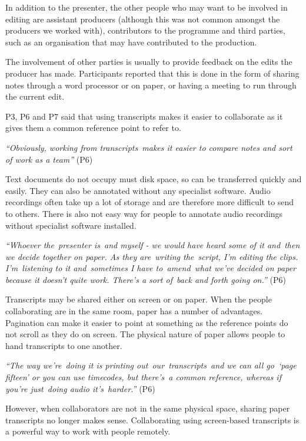 In addition to the presenter, the other people who may want to be involved in editing are assistant producers (although
this was not common amongst the producers we worked with), contributors to the programme and third parties, such as an
organisation that may have contributed to the production.

The involvement of other parties is usually to provide feedback on the edits the producer has made. Participants
reported that this is done in the form of sharing notes through a word processor or on paper, or having a meeting to
run through the current edit.


P3, P6 and P7 said that using transcripts makes it easier to collaborate as it gives them a common reference point to
refer to.

\textit{``Obviously, working from transcripts makes it easier to compare notes and sort of work as a team''} (P6)

Text documents do not occupy must disk space, so can be transferred quickly and easily.
They can also be annotated without any specialist software. Audio recordings often take up a lot of storage and are
therefore more difficult to send to others. There is also not easy way for people to annotate audio recordings without
specialist software installed.

\textit{``Whoever the presenter is and myself - we would have heard some of it and then we decide together on paper. As
they are writing the script, I'm editing the clips. I'm listening to it and sometimes I have to amend what we've
decided on paper because it doesn't quite work. There's a sort of back and forth going on.''} (P6)


Transcripts may be shared either on screen or on paper. When the people collaborating are in the same room, paper has a
number of advantages. Pagination can make it easier to point at something as the reference points do not scroll as they
do on screen. The physical nature of paper allows people to hand transcripts to one another.

\textit{``The way we're doing it is printing out our transcripts and we can all go `page fifteen' or you can
use timecodes, but there's a common reference, whereas if you're just doing audio it's harder.''} (P6)

However, when collaborators are not in the same physical space, sharing paper transcripts no longer makes sense.
Collaborating using screen-based transcripts is a powerful way to work with people remotely.

